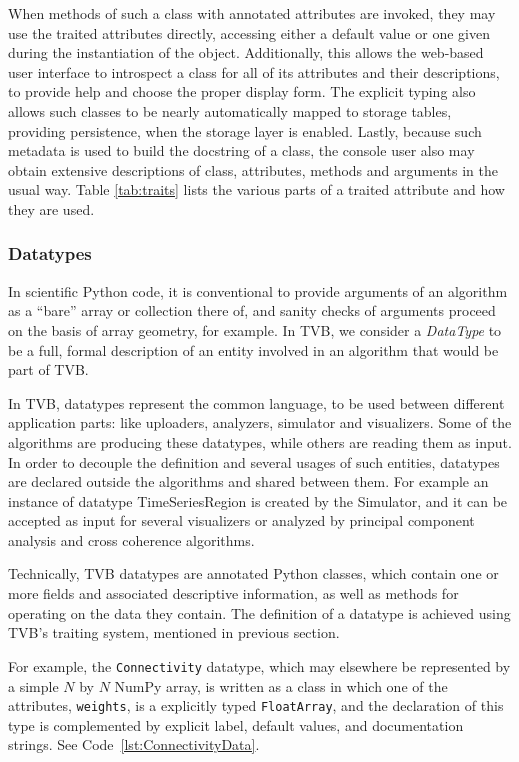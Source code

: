 When methods of such a class with annotated attributes are invoked, they may use
the traited attributes directly, accessing either a default value or one given
during the instantiation of the object. Additionally, this allows the web-based
user interface to introspect a class for all of its attributes and their
descriptions, to provide help and choose the proper display form. The explicit
typing also allows such classes to be nearly automatically mapped to storage
tables, providing persistence, when the storage layer is enabled.  Lastly,
because such metadata is used to build the docstring of a class, the console
user also may obtain extensive descriptions of class, attributes, methods and
arguments in the usual way. Table \ref{tab:traits} lists the various parts 
of a traited attribute and how they are used. 


\subsubsection{Datatypes}

In scientific Python code, it is conventional to provide arguments
of an algorithm as a ``bare'' array or collection there of, and sanity
checks of arguments proceed on the basis of array geometry, for example.
In TVB, we consider a \textit{DataType} to be a full, formal description of 
an entity involved in an algorithm that would be part of TVB. 

In TVB, datatypes represent the common language, to be used between different
application parts: like uploaders, analyzers, simulator and visualizers.
Some of the algorithms are producing these datatypes, while others are reading
them as input.  In order to decouple the definition and several usages of such
entities, datatypes are declared outside the algorithms and shared between them.
For example an instance of datatype TimeSeriesRegion is created by the
Simulator, and it can be accepted as input for several visualizers or analyzed
by principal component analysis and cross coherence algorithms.

Technically, TVB datatypes are annotated Python classes, which
contain one or more fields and associated descriptive information, as
well as methods for operating on the data they contain. The definition of a
datatype is achieved using TVB's traiting system, mentioned in previous section.

For example, the \texttt{Connectivity} datatype, which may elsewhere
be represented by a simple $N$ by $N$ NumPy array, is written as a class
in which one of the attributes, \texttt{weights}, is a explicitly typed 
\texttt{FloatArray}, and the declaration of this type is complemented by
explicit label, default values, and documentation strings. See
Code~\ref{lst:ConnectivityData}.

